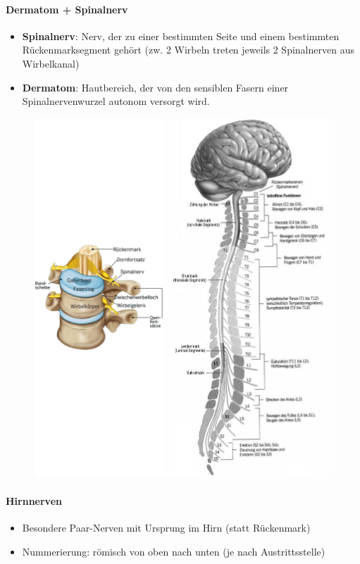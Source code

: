 \paragraph{Dermatom + Spinalnerv}
\begin{itemize}
  \item \textbf{Spinalnerv}: Nerv, der zu einer bestimmten Seite und einem bestimmten Rückenmarksegment gehört (zw. 2 Wirbeln treten jeweils 2 Spinalnerven aus Wirbelkanal)
  \item \textbf{Dermatom}: Hautbereich, der von den sensiblen Fasern einer Spinalnervenwurzel autonom versorgt wird.
\end{itemize}
\begin{figure}[H]
  \centering
  \includegraphics[width=\linewidth]{assets/img/rueckenmark.jpg}
\end{figure}

\paragraph{Hirnnerven}
\begin{itemize}
  \item Besondere Paar-Nerven mit Ursprung im Hirn (statt Rückenmark)
  \item Nummerierung: römisch von oben nach unten (je nach Austrittsstelle)
\end{itemize}

